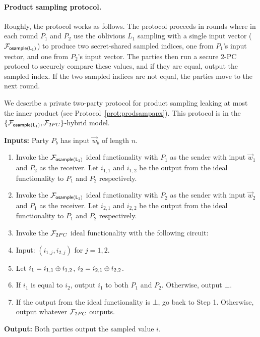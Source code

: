\paragraph{Product sampling protocol.}
Roughly, the protocol works as follows.  The protocol proceeds in rounds
where in each round $P_1$ and $P_2$ use the oblivious $L_1$ sampling
with a single input vector ($\mathcal{F}_{\mathsf{osample(L_1)}}$) to produce two secret-shared
sampled indices, one from $P_1$'s input vector, and one from $P_2$'s
input vector.  The parties then run a secure 2-PC protocol to securely
compare these values, and if they are equal, output the sampled index.
If the two sampled indices are not equal, the parties move to the next
round.

We describe a private two-party protocol for product sampling leaking at
most the inner product (see Protocol~\ref{prot:prodsampapx}). This
protocol is in the $\{\F_\oslone, \F_{2PC} \}$-hybrid model.

\begin{algorithm}[htbp]
\textbf{Inputs:} Party $P_b$ has input $\vec{w}_b$ of length $n$.   

\begin{enumerate}
    \item Invoke the $\mathcal{F}_{\mathsf{osample(L_1)}}$ ideal functionality with $P_1$ as the
    sender with input $\vec{w}_1$ and $P_2$ as the receiver.  Let
    $i_{1,1}$ and $i_{1,2}$ be the output from the ideal functionality
    to $P_1$ and $P_2$ respectively. 
    
    \item Invoke the $\mathcal{F}_{\mathsf{osample(L_1)}}$ ideal functionality with $P_2$ as the
    sender with input $\vec{w}_2$ and $P_1$ as the receiver.  Let
    $i_{2,1}$ and $i_{2,2}$ be the output from the ideal functionality
    to $P_1$ and $P_2$ respectively.
    
    \item Invoke the $\mathcal{F}_{2PC}$ ideal functionality with the following circuit: 
      \BEN
      \item[] \hspace{-2em} Input: $(i_{1,j}, i_{2,j})$ for $j = 1, 2$. 
      \item Let $i_1 = i_{1,1} \oplus i_{1,2}$, $i_2 = i_{2,1} \oplus i_{2,2}$. 
      \item If $i_1$ is equal to $i_2$, output $i_1$ to both $P_1$ and $P_2$. Otherwise,
      output $\bot$.
      \EEN
  
    \item If the output from the ideal functionality is $\bot$, go back to Step 1.
    Otherwise, output whatever $\mathcal{F}_{2PC}$ outputs. 
\end{enumerate}
\textbf{Output:} Both parties output the sampled value $i$. 

\caption{Product sampling ($\Pp^{IP}$) in the $\{\F_\oslone, \F_{2PC} \}$-hybrid.
\label{prot:prodsampapx}
}
\end{algorithm}



